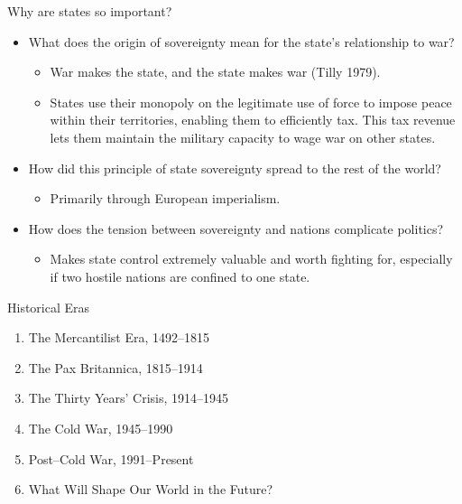 \documentclass[handout]{beamer}
\begin{document}
\begin{frame}{\LARGE Why are states so important?}
	\begin{itemize}
	     \item What does the origin of sovereignty mean for the state's relationship to war? \pause 
	    \begin{itemize}
	        \item War makes the state, and the state makes war (Tilly 1979). \pause
	        \item States use their monopoly on the legitimate use of force to impose peace within their territories, enabling them to efficiently tax. This tax revenue lets them maintain the military capacity to wage war on other states.
	    \end{itemize}
	    \item How did this principle of state sovereignty spread to the rest of the world? \pause
	    \begin{itemize}
	        \item Primarily through European imperialism. \pause
	    \end{itemize}
	    \item How does the tension between sovereignty and nations complicate politics? \pause
	    \begin{itemize}
	        \item Makes state control extremely valuable and worth fighting for, especially if two hostile nations are confined to one state.
	    \end{itemize}
	\end{itemize}
\end{frame}

\begin{frame}{\LARGE Historical Eras}
\begin{enumerate}
	\item The Mercantilist Era, 1492–1815
	\item The Pax Britannica, 1815–1914
	\item The Thirty Years’ Crisis, 1914–1945
	\item The Cold War, 1945–1990
	\item Post–Cold War, 1991–Present
	\item What Will Shape Our World in the Future?	
\end{enumerate}
\end{frame}
\end{document}
